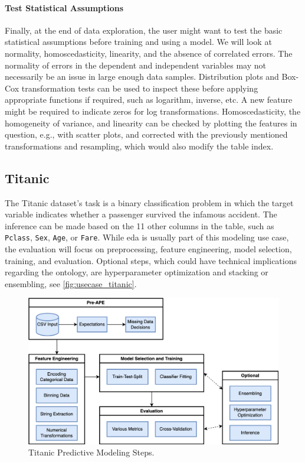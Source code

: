\paragraph{Test Statistical Assumptions}
Finally, at the end of data exploration, the user might want to test the basic statistical assumptions before training and using a model. We will look at normality, homoscedasticity, linearity, and the absence of correlated errors. The normality of errors in the dependent and independent variables may not necessarily be an issue in large enough data samples. Distribution plots and Box-Cox transformation tests can be used to inspect these before applying appropriate functions if required, such as logarithm, inverse, etc. A new feature might be required to indicate zeros for log transformations. Homoscedasticity, the homogeneity of variance, and linearity can be checked by plotting the features in question, e.g., with scatter plots, and corrected with the previously mentioned transformations and resampling, which would also modify the table index.

\subsection{Titanic}
The Titanic dataset’s task is a binary classification problem in which the target variable indicates whether a passenger survived the infamous accident. The inference can be made based on the 11 other columns in the table, such as \verb|Pclass|, \verb|Sex|, \verb|Age|, or \verb|Fare|. While \ac{eda} is usually part of this modeling use case, the evaluation will focus on preprocessing, feature engineering, model selection, training, and evaluation. Optional steps, which could have technical implications regarding the ontology, are hyperparameter optimization and stacking or ensembling, see \autoref{fig:usecase_titanic}.

\begin{figure}
    \centering
    \includegraphics[width=\linewidth]{Tex/images/titanic.png}
    \caption{Titanic Predictive Modeling Steps.}
    \label{fig:usecase_titanic}
\end{figure}

